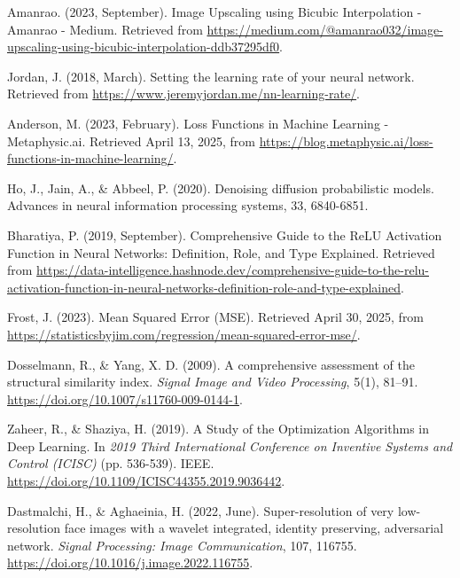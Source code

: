 \documentclass[twocolumn]{article}
\begin{document}
\begin{thebibliography}{99}
     Amanrao. (2023, September). Image Upscaling using Bicubic Interpolation - Amanrao - Medium. Retrieved from \url{https://medium.com/@amanrao032/image-upscaling-using-bicubic-interpolation-ddb37295df0}.
    
     Jordan, J. (2018, March). Setting the learning rate of your neural network. Retrieved from \url{https://www.jeremyjordan.me/nn-learning-rate/}.
    
     Anderson, M. (2023, February). Loss Functions in Machine Learning - Metaphysic.ai. Retrieved April 13, 2025, from \url{https://blog.metaphysic.ai/loss-functions-in-machine-learning/}.
    
     Ho, J., Jain, A., \& Abbeel, P. (2020). Denoising diffusion probabilistic models. Advances in neural information processing systems, 33, 6840-6851.

     Bharatiya, P. (2019, September). Comprehensive Guide to the ReLU Activation Function in Neural Networks: Definition, Role, and Type Explained. Retrieved from \href{https://data-intelligence.hashnode.dev/comprehensive-guide-to-the-relu-activation-function-in-neural-networks-definition-role-and-type-explained}{https://data-intelligence.hashnode.dev/comprehensive-guide-to-the-relu-activation-function-in-neural-networks-definition-role-and-type-explained}.
    
     Frost, J. (2023). Mean Squared Error (MSE). Retrieved April 30, 2025, from \url{https://statisticsbyjim.com/regression/mean-squared-error-mse/}.
    
     Dosselmann, R., \& Yang, X. D. (2009). A comprehensive assessment of the structural similarity index. \textit{Signal Image and Video Processing}, 5(1), 81–91. \url{https://doi.org/10.1007/s11760-009-0144-1}.
    
     Zaheer, R., \& Shaziya, H. (2019). A Study of the Optimization Algorithms in Deep Learning. In \textit{2019 Third International Conference on Inventive Systems and Control (ICISC)} (pp. 536-539). IEEE. \url{https://doi.org/10.1109/ICISC44355.2019.9036442}.
    
     Dastmalchi, H., \& Aghaeinia, H. (2022, June). Super-resolution of very low-resolution face images with a wavelet integrated, identity preserving, adversarial network. \textit{Signal Processing: Image Communication}, 107, 116755. \url{https://doi.org/10.1016/j.image.2022.116755}.
    

\end{thebibliography}
\end{document}

